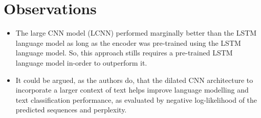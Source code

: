 \documentclass[12pt]{article}
\begin{document}
\section{Observations}
  \begin{itemize}
    \item The large CNN model (LCNN) performed marginally better than the LSTM language model as long as the encoder was pre-trained using the LSTM language model. So, this approach stills requires a pre-trained LSTM language model in-order to outperform it. 
    \item It could be argued, as the authors do, that the dilated CNN architecture to incorporate a larger context of text helps improve language modelling and text classification performance, as evaluated by negative log-likelihood of the predicted sequences and perplexity.
  \end{itemize}



\end{document}
